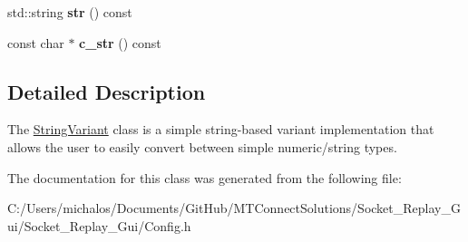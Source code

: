 \begin{DoxyCompactItemize}
\item 
\hypertarget{class_nist_1_1_string_variant_a416b9d89f3a728a4650c8b8396267f99}{}std\+::string {\bfseries str} () const \label{class_nist_1_1_string_variant_a416b9d89f3a728a4650c8b8396267f99}

\item 
\hypertarget{class_nist_1_1_string_variant_a95f7d8bae94e138c6c6bd2f5ecea3fd9}{}const char $\ast$ {\bfseries c\+\_\+str} () const \label{class_nist_1_1_string_variant_a95f7d8bae94e138c6c6bd2f5ecea3fd9}

\end{DoxyCompactItemize}


\subsection{Detailed Description}
The \hyperlink{class_nist_1_1_string_variant}{String\+Variant} class is a simple string-\/based variant implementation that allows the user to easily convert between simple numeric/string types. 

The documentation for this class was generated from the following file\+:\begin{DoxyCompactItemize}
\item 
C\+:/\+Users/michalos/\+Documents/\+Git\+Hub/\+M\+T\+Connect\+Solutions/\+Socket\+\_\+\+Replay\+\_\+\+Gui/\+Socket\+\_\+\+Replay\+\_\+\+Gui/Config.\+h\end{DoxyCompactItemize}
